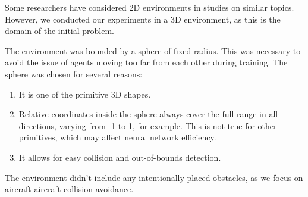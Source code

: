 
Some researchers have considered 2D environments in studies on similar topics.
However, we conducted our experiments in a 3D environment, as this is the domain of the initial problem.

The environment was bounded by a sphere of fixed radius.
This was necessary to avoid the issue of agents moving too far from each other during training.
The sphere was chosen for several reasons:

\begin{enumerate}
	\item It is one of the primitive 3D shapes.
	\item Relative coordinates inside the sphere always cover the full range in all directions, varying from -1 to 1, for example.
	This is not true for other primitives, which may affect neural network efficiency.
	\item It allows for easy collision and out-of-bounds detection.
\end{enumerate}

The environment didn't include any intentionally placed obstacles, as we focus on aircraft-aircraft collision avoidance. 